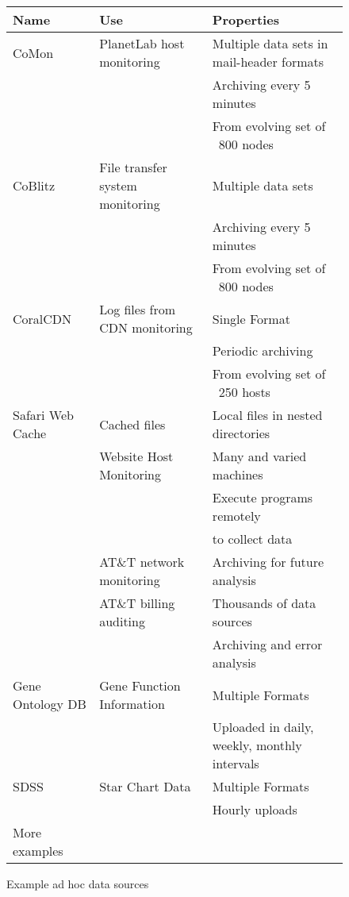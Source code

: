 \documentclass[nocopyrightspace]{sigplanconf}
\begin{document}
\begin{figure*}
\begin{center}
\begin{tabular}{|l|l|l|}
\hline\hline
Name & Use & Properties 
\\\hline\hline
CoMon & PlanetLab host monitoring & Multiple data sets in mail-header formats\\
                                       && Archiving every 5 minutes \\
                                       && From evolving set of ~800 nodes \\\hline
CoBlitz & File transfer system monitoring & Multiple data sets \\
                                       && Archiving every 5 minutes \\
                                       && From evolving set of ~800 nodes \\\hline
CoralCDN & Log files from CDN monitoring & Single Format \\
                                       && Periodic archiving \\
                                       && From evolving set of ~250 hosts \\\hline
Safari Web Cache & Cached files        & Local files in nested directories \\\hline
\vizGems{}       & Website Host Monitoring & Many and varied machines \\
                 &                         & Execute programs remotely\\
                 &                         & to collect data\\\hline
\darkstar{}      & AT\&T network monitoring & Archiving for future analysis \\\hline
\ningaui{}       & AT\&T billing auditing   & Thousands of data sources\\
                 &                          & Archiving and error analysis\\\hline
Gene Ontology DB & Gene Function Information & Multiple Formats \\
                                             && Uploaded in daily, weekly, monthly intervals \\\hline
SDSS & Star Chart Data & Multiple Formats \\
                       && Hourly uploads \\\hline
More examples & & \\
\hline\hline
\end{tabular}
\end{center}
\caption{Example ad hoc data sources}
\label{fig:exampledata}
\end{figure*}
\end{document}
